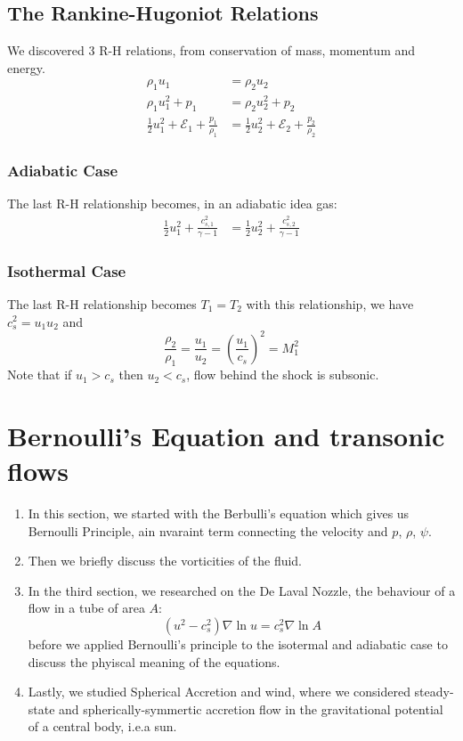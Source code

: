 \documentclass[12pt,a4paper]{article}
\begin{document}
\subsection{The Rankine-Hugoniot Relations}
    We discovered 3 R-H relations, from conservation of mass, momentum and energy.
    \begin{align*}
        \rho_1 u_1&=\rho_2 u_2\\
        \rho_1 u_1^2+p_1&=\rho_2 u_2^2+p_2\\
        \frac{1}{2} u_1^2+\mathcal{E}_1+\frac{p_1}{\rho_1}&=\frac{1}{2} u_2^2+\mathcal{E}_2+\frac{p_2}{\rho_2}
    \end{align*}
    \subsubsection{Adiabatic Case}
    The last R-H relationship becomes, in an adiabatic idea gas:
    \begin{align*}
        \frac{1}{2} u_1^2+\frac{c_{s, 1}^2}{\gamma-1}&=\frac{1}{2} u_2^2+\frac{c_{s, 2}^2}{\gamma-1}
    \end{align*}

    \subsubsection{Isothermal Case}
    The last R-H relationship becomes $T_1=T_2$
    with this relationship, we have $c_s^2=u_1u_2$ and 
    $$ 
    \frac{\rho_2}{\rho_1}=\frac{u_1}{u_2}=\left(\frac{u_1}{c_s}\right)^2=M_1^2
    $$
    Note that if $u_1>c_s$ then $u_2<c_s$, flow behind the shock is subsonic.

\section{Bernoulli's Equation and transonic flows}
\begin{enumerate}
    \item In this section, we started with the Berbulli's equation which gives us Bernoulli Principle, ain nvaraint term connecting the velocity and $p$, $\rho$, $\psi$.
    \item Then we briefly discuss the vorticities of the fluid.
    \item In the third section, we researched on the De Laval Nozzle, the behaviour of a flow in a tube of area $A$:
    $$
    \left(u^2-c_s^2\right) \nabla \ln u=c_s^2 \nabla \ln A
    $$
    before we applied Bernoulli's principle to the isotermal and adiabatic case to discuss the phyiscal meaning of the equations.
    \item Lastly, we studied Spherical Accretion and wind, where we considered steady-state and spherically-symmertic accretion flow in the gravitational potential of a central body, i.e.a sun.
\end{enumerate}
\end{document}
